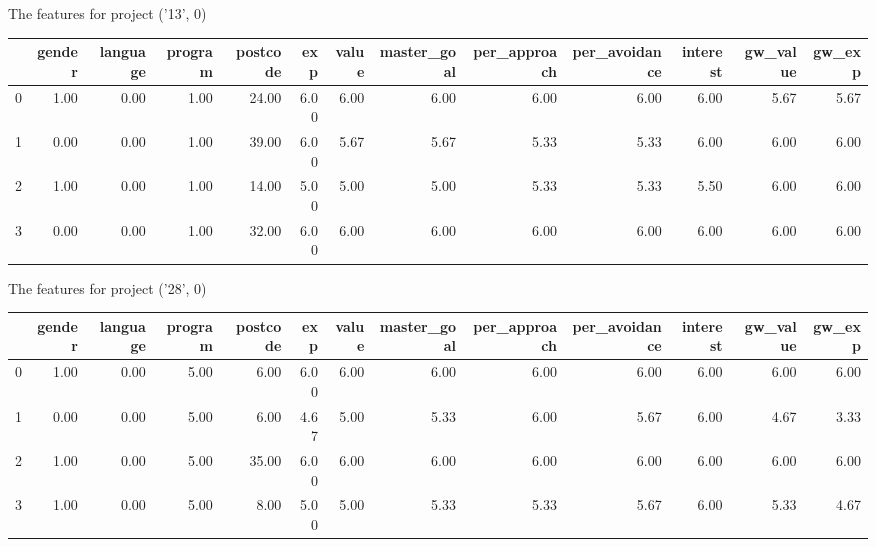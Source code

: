 \documentclass[7pt]{article}
\begin{document}
\begin{landscape}
The features for project ('13', 0)\newline
\begin{tabular}{lrrrrrrrrrrrr}
\toprule
{} &  gender &  language &  program &  postcode &  exp &  value &  master\_goal &  per\_approach &  per\_avoidance &  interest &  gw\_value &  gw\_exp \\
\midrule
0 &    1.00 &      0.00 &     1.00 &     24.00 & 6.00 &   6.00 &         6.00 &          6.00 &           6.00 &      6.00 &             5.67 &           5.67 \\
1 &    0.00 &      0.00 &     1.00 &     39.00 & 6.00 &   5.67 &         5.67 &          5.33 &           5.33 &      6.00 &             6.00 &           6.00 \\
2 &    1.00 &      0.00 &     1.00 &     14.00 & 5.00 &   5.00 &         5.00 &          5.33 &           5.33 &      5.50 &             6.00 &           6.00 \\
3 &    0.00 &      0.00 &     1.00 &     32.00 & 6.00 &   6.00 &         6.00 &          6.00 &           6.00 &      6.00 &             6.00 &           6.00 \\
\bottomrule
\end{tabular}

The features for project ('28', 0)\newline
\begin{tabular}{lrrrrrrrrrrrr}
\toprule
{} &  gender &  language &  program &  postcode &  exp &  value &  master\_goal &  per\_approach &  per\_avoidance &  interest &  gw\_value &  gw\_exp \\
\midrule
0 &    1.00 &      0.00 &     5.00 &      6.00 & 6.00 &   6.00 &         6.00 &          6.00 &           6.00 &      6.00 &             6.00 &           6.00 \\
1 &    0.00 &      0.00 &     5.00 &      6.00 & 4.67 &   5.00 &         5.33 &          6.00 &           5.67 &      6.00 &             4.67 &           3.33 \\
2 &    1.00 &      0.00 &     5.00 &     35.00 & 6.00 &   6.00 &         6.00 &          6.00 &           6.00 &      6.00 &             6.00 &           6.00 \\
3 &    1.00 &      0.00 &     5.00 &      8.00 & 5.00 &   5.00 &         5.33 &          5.33 &           5.67 &      6.00 &             5.33 &           4.67 \\
\bottomrule
\end{tabular}


\end{landscape}
\end{document}
